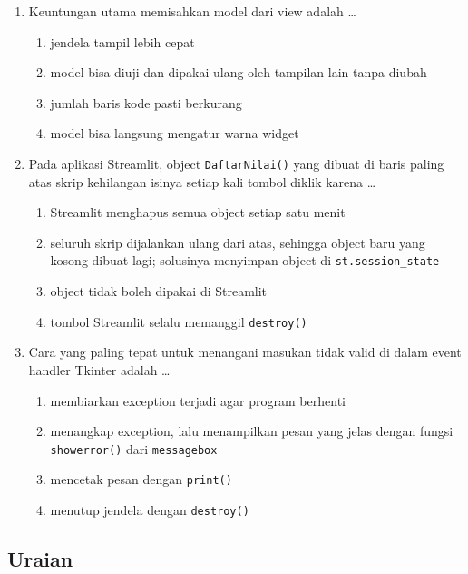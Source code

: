 \begin{enumerate}
  \item Keuntungan utama memisahkan model dari view adalah \ldots
  \begin{enumerate}[label=\alph*.,itemsep=0pt]
    \item jendela tampil lebih cepat
    \item model bisa diuji dan dipakai ulang oleh tampilan lain tanpa diubah
    \item jumlah baris kode pasti berkurang
    \item model bisa langsung mengatur warna widget
  \end{enumerate}

  \item Pada aplikasi Streamlit, object \texttt{DaftarNilai()} yang dibuat di baris paling atas skrip kehilangan isinya setiap kali tombol diklik karena \ldots
  \begin{enumerate}[label=\alph*.,itemsep=0pt]
    \item Streamlit menghapus semua object setiap satu menit
    \item seluruh skrip dijalankan ulang dari atas, sehingga object baru yang kosong dibuat lagi; solusinya menyimpan object di \texttt{st.session\_state}
    \item object tidak boleh dipakai di Streamlit
    \item tombol Streamlit selalu memanggil \texttt{destroy()}
  \end{enumerate}

  \item Cara yang paling tepat untuk menangani masukan tidak valid di dalam event handler Tkinter adalah \ldots
  \begin{enumerate}[label=\alph*.,itemsep=0pt]
    \item membiarkan exception terjadi agar program berhenti
    \item menangkap exception, lalu menampilkan pesan yang jelas dengan fungsi \texttt{showerror()} dari \texttt{messagebox}
    \item mencetak pesan dengan \texttt{print()}
    \item menutup jendela dengan \texttt{destroy()}
  \end{enumerate}
\end{enumerate}

\subsection{Uraian}


